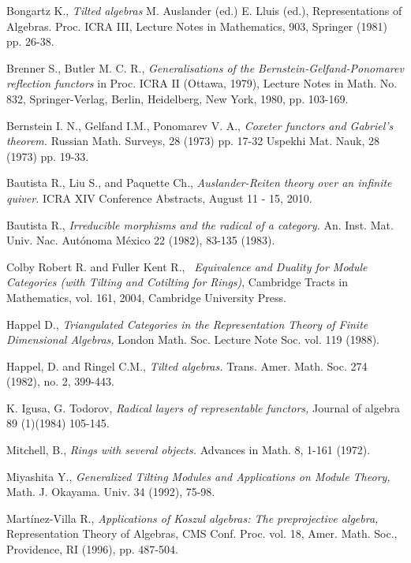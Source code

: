 \documentclass{amsart}
\theoremstyle{plain}
\numberwithin{equation}{section}
\begin{document}
\begin{thebibliography}{ABPRS}
 Bongartz K., \textsl{Tilted algebras} M. Auslander (ed.) E.
Lluis (ed.), Representations of Algebras. Proc. ICRA III, Lecture Notes in
Mathematics, 903, Springer (1981) pp. 26-38.

 Brenner S., Butler M. C. R., \textsl{Generalisations of the
Bernstein-Gelfand-Ponomarev reflection functors} in Proc. ICRA II (Ottawa,
1979), Lecture Notes in Math. No. 832, Springer-Verlag, Berlin, Heidelberg,
New York, 1980, pp. 103-169.

 Bernstein I. N., Gelfand I.M., Ponomarev V. A., \textsl{Coxeter functors and Gabriel's theorem.} Russian Math. Surveys, 28 (1973)
pp. 17-32 Uspekhi Mat. Nauk, 28 (1973) pp. 19-33.

 Bautista R., Liu S., and Paquette Ch., \textsl{Auslander-Reiten theory over an infinite quiver.} ICRA XIV Conference
Abstracts, August 11 - 15, 2010.

 Bautista R., \textsl{Irreducible morphisms and the radical
of a category.} An. Inst. Mat. Univ. Nac. Aut\'{o}noma M\'{e}xico 22 (1982),
83-135 (1983).

 Colby Robert R. and Fuller Kent R., \textsl{\ Equivalence
and Duality for Module Categories (with Tilting and Cotilting for Rings)},
Cambridge Tracts in Mathematics, vol. 161, 2004, Cambridge University Press.

 Happel D., \textsl{Triangulated Categories in the
Representation Theory of Finite Dimensional Algebras,} London Math. Soc.
Lecture Note Soc. vol. 119 (1988).

 Happel, D. and Ringel C.M., \textsl{Tilted algebras.}
Trans. Amer. Math. Soc. 274 (1982), no. 2, 399-443.

 K. Igusa, G. Todorov, \textsl{Radical layers of
representable functors,} Journal of algebra 89 (1)(1984) 105-145.

 Mitchell, B., \textsl{Rings with several objects.} Advances
in Math. 8, 1-161 (1972).

 Miyashita Y., \textsl{Generalized Tilting Modules and
Applications on Module Theory,} Math. J. Okayama. Univ. 34 (1992), 75-98.

 Mart\'inez-Villa R., \textsl{Applications of Koszul
algebras: The preprojective algebra,} Representation Theory of Algebras, CMS
Conf. Proc. vol. 18, Amer. Math. Soc., Providence, RI (1996), pp. 487-504.


\end{thebibliography}
\end{document}
